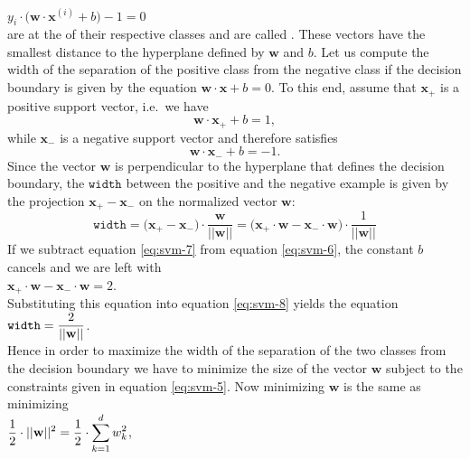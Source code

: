 $y_i \cdot \bigl(\mathbf{w} \cdot \mathbf{x}^{(i)} + b\bigr) - 1 = 0$
\\[0.2cm]
are at the  of their respective classes and are called .  These vectors
have the smallest distance to the hyperplane defined by $\mathbf{w}$ and $b$.  Let us compute the width of the
separation of the positive class from the negative class if the decision boundary is given by the  equation
$\mathbf{w} \cdot \mathbf{x} + b = 0$.  To this end, assume that $\mathbf{x}_+$ is a positive support vector,
i.e.~we have
\begin{equation}
  \label{eq:svm-6}
  \mathbf{w} \cdot \mathbf{x}_+ + b = 1,  
\end{equation}
while $\mathbf{x}_-$ is a negative support vector and therefore satisfies
\begin{equation}
  \label{eq:svm-7}
  \mathbf{w} \cdot \mathbf{x}_- + b = -1.  
\end{equation}
Since the vector $\mathbf{w}$ is perpendicular to the hyperplane that defines the decision boundary, the $\mathtt{width}$
between the positive and the negative example is given by the projection $\mathbf{x}_+ - \mathbf{x}_-$ on the normalized vector $\mathbf{w}$:
\begin{equation}
  \label{eq:svm-8}
 \mathtt{width} = \bigl(\mathbf{x}_+ - \mathbf{x}_-\bigr) \cdot \frac{\mathbf{w}}{||\mathbf{w}||} =
\bigl(\mathbf{x}_+ \cdot \mathbf{w} - \mathbf{x}_-\cdot \mathbf{w}\bigr) \cdot \frac{1}{||\mathbf{w}||}   
\end{equation}
If we subtract equation \ref{eq:svm-7} from equation \ref{eq:svm-6}, the constant $b$ cancels and we are left
with 
\\[0.2cm]
\hspace*{1.3cm}
$\mathbf{x}_+ \cdot \mathbf{w} - \mathbf{x}_- \cdot \mathbf{w} = 2$.  
\\[0.2cm]
Substituting this equation into equation \ref{eq:svm-8} yields the equation
\\[0.2cm]
\hspace*{1.3cm}
$\displaystyle \mathtt{width} = \frac{2}{||\mathbf{w}||}$.
\\[0.2cm]
Hence in order to maximize the width of the separation of the two classes from the decision boundary we have to
minimize the size of the vector $\textbf{w}$ subject to the constraints given in equation \ref{eq:svm-5}.  Now minimizing $\mathbf{w}$
is the same as minimizing
\\[0.2cm]
\hspace*{1.3cm}
$\displaystyle \frac{1}{2} \cdot ||\mathbf{w}||^2 = \frac{1}{2} \cdot \sum\limits_{k=1}^d w_k^2$,
